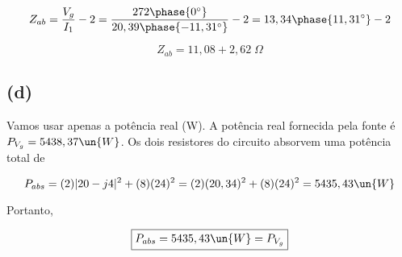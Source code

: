 \[ Z_{ab} = \frac{V_g}{I_1} - 2 = \frac{272\phase{0^{\circ}}}{20,39\phase{-11,31^{\circ}}} - 2 = 13,34\phase{11,31^{\circ}} - 2 \]

\[ \boxed{Z_{ab} = 11,08 + 2,62 \;\Omega} \]

\subsection*{(d)}

Vamos usar apenas a potência real (W). A potência real fornecida pela fonte é $P_{V_g} = 5438,37 \un{W}$. Os dois resistores
do circuito absorvem uma potência total de 

\[ P_{abs} = (2)|20 - j4|^2 + (8)(24)^2 = (2)(20,34)^2 + (8)(24)^2 = 5435,43 \un{W}  \]

Portanto, 

\[ \boxed{P_{abs} = 5435,43 \un{W} = P_{V_g}} \]









